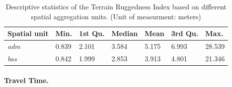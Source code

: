 \documentclass[a4paper,11pt]{article}
\begin{document}
\begin{table}[H]

\caption[Descriptive statistics of the Terrain Ruggedness Index (TRI).]{\label{tab:02-data-tri}Descriptive statistics of the Terrain Ruggedness Index based on different spatial aggregation units. (Unit of measurment: meters)}
\centering
\fontsize{10}{12}\selectfont
\begin{tabular}[t]{lllllll}
\toprule
Spatial unit & Min. & 1st Qu. & Median & Mean & 3rd Qu. & Max.\\
\midrule
\textit{adm} & 0.839 & 2.101 & 3.584 & 5.175 & 6.993 & 28.539\\
\textit{bas} & 0.842 & 1.999 & 2.853 & 3.913 & 4.801 & 21.346\\
\bottomrule
\end{tabular}
\end{table}
\hypertarget{travel-time.}{%
\paragraph{Travel Time.}\label{travel-time.}}
\end{document}

